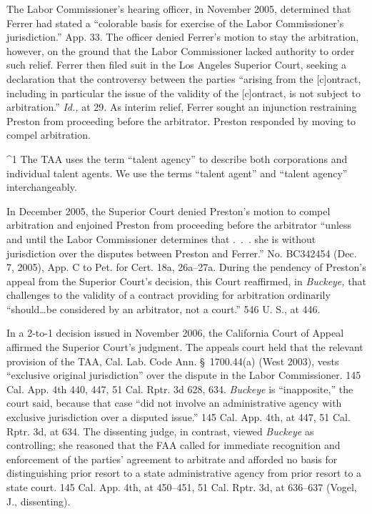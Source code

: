   The Labor Commissioner's hearing officer, in November 2005,
determined that Ferrer had stated a ``colorable basis for exercise of
the Labor Commissioner's jurisdiction.'' App. 33. The officer
denied Ferrer's motion to stay the arbitration, however, on the ground
that the Labor Commissioner lacked authority to order such relief.
Ferrer then filed suit in the Los Angeles Superior Court, seeking a
declaration that the controversy between the parties ``arising from
the [c]ontract, including in particular the issue of the validity of
the [c]ontract, is not subject to arbitration.'' \emph{Id.,} \newpage  at
29. As interim relief, Ferrer sought an injunction restraining Preston
from proceeding before the arbitrator. Preston responded by moving to
compel arbitration.

^1 The TAA uses the term ``talent agency'' to describe both
corporations and individual talent agents. We use the terms ``talent
agent'' and ``talent agency'' interchangeably.

  In December 2005, the Superior Court denied Preston's motion to
compel arbitration and enjoined Preston from proceeding before the
arbitrator ``unless and until the Labor Commissioner determines that
.~.~. she is without jurisdiction over the disputes between Preston
and Ferrer.'' No. BC342454 (Dec. 7, 2005), App. C to Pet. for Cert.
18a, 26a--27a. During the pendency of Preston's appeal from the
Superior Court's decision, this Court reaffirmed, in \emph{Buckeye,}
that challenges to the validity of a contract providing for arbitration
ordinarily ``should\dots be considered by an arbitrator, not a
court.'' 546 U. S., at 446.

  In a 2-to-1 decision issued in November 2006, the California Court
of Appeal affirmed the Superior Court's judgment. The appeals
court held that the relevant provision of the TAA, Cal. Lab. Code
Ann. \S~1700.44(a) (West 2003), vests ``exclusive original
jurisdiction'' over the dispute in the Labor Commissioner. 145
Cal. App. 4th 440, 447, 51 Cal. Rptr. 3d 628, 634. \emph{Buckeye} is
``inapposite,'' the court said, because that case ``did not involve
an administrative agency with exclusive jurisdiction over a disputed
issue.'' 145 Cal. App. 4th, at 447, 51 Cal. Rptr. 3d, at 634. The
dissenting judge, in contrast, viewed \emph{Buckeye} as controlling; she
reasoned that the FAA called for immediate recognition and enforcement
of the parties' agreement to arbitrate and afforded no basis for
distinguishing prior resort to a state administrative agency from prior
resort to a state court. 145 Cal. App. 4th, at 450--451, 51 Cal.
Rptr. 3d, at 636--637 (Vogel, J., dissenting).

